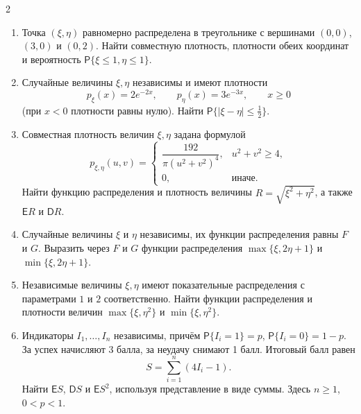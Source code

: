 \documentclass[a4paper,10pt]{article}
\newcommand{\PP}{\mathsf P}
\newcommand{\EE}{\mathsf E}
\newcommand{\DD}{\mathsf D}
\begin{document}
\begin{multicols}{2}
\begin{enumerate}
\item\begin{minipage}[t]{\linewidth} Точка $(\xi,\eta)$ равномерно распределена в треугольнике с вершинами $(0,0)$, $(3,0)$ и $(0,2)$. Найти совместную плотность, плотности обеих координат и вероятность $\PP\{\xi\leq1,\eta\leq1\}$.
\end{minipage}


\item\begin{minipage}[t]{\linewidth} Случайные величины $\xi,\eta$ независимы и имеют плотности
\[
p_\xi(x)=2e^{-2x},\qquad p_\eta(x)=3e^{-3x},\qquad x\geq0
\]
(при $x<0$ плотности равны нулю). Найти $\PP\{|\xi-\eta|\leq\tfrac12\}$.
\end{minipage}


\item\begin{minipage}[t]{\linewidth} Совместная плотность величин $\xi,\eta$ задана формулой
\[
p_{\xi,\eta}(u,v)=\begin{cases}\dfrac{192}{\pi(u^2+v^2)^4},&u^2+v^2\geq4,\\[3pt]0,&\text{иначе}.\end{cases}
\]
Найти функцию распределения и плотность величины $R=\sqrt{\xi^2+\eta^2}$, а также $\EE R$ и $\DD R$.
\end{minipage}


\item\begin{minipage}[t]{\linewidth} Случайные величины $\xi$ и $\eta$ независимы, их функции распределения равны $F$ и $G$. Выразить через $F$ и $G$ функции распределения $\max\{\xi,2\eta+1\}$ и $\min\{\xi,2\eta+1\}$.
\end{minipage}


\item\begin{minipage}[t]{\linewidth} Независимые величины $\xi,\eta$ имеют показательные распределения с параметрами $1$ и $2$ соответственно. Найти функции распределения и плотности величин $\max\{\xi,\eta^2\}$ и $\min\{\xi,\eta^2\}$.
\end{minipage}


\item\begin{minipage}[t]{\linewidth} Индикаторы $I_1,\ldots,I_n$ независимы, причём $\PP\{I_i=1\}=p$, $\PP\{I_i=0\}=1-p$. За успех начисляют 3 балла, за неудачу снимают 1 балл. Итоговый балл равен
\[
S=\sum_{i=1}^n(4I_i-1).
\]
Найти $\EE S$, $\DD S$ и $\EE S^2$, используя представление в виде суммы. Здесь $n\geq1$, $0<p<1$.
\end{minipage}



\end{enumerate}
\end{multicols}
\end{document}
